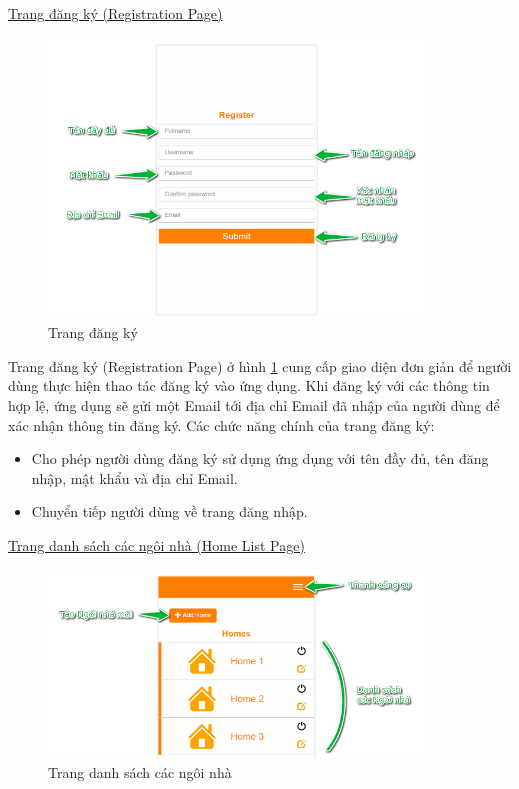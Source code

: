 \documentclass[12pt,a4paper,oneside]{extbook}
\begin{document}
\noindent
\underline{Trang đăng ký (Registration Page)}

\begin{figure}[h]
  \centering
     \includegraphics[width=10cm]{6-RegisterPage}
  \caption{Trang đăng ký}\label{fig:6-RegisterPage}
\end{figure}

\noindent
Trang đăng ký (Registration Page) ở hình \ref{fig:6-RegisterPage} cung cấp giao diện đơn giản để người dùng thực hiện thao tác đăng ký vào ứng dụng. Khi đăng ký với các thông tin hợp lệ, ứng dụng sẽ gửi một Email tới địa chỉ Email đã nhập của người dùng để xác nhận thông tin đăng ký. Các chức năng chính của trang đăng ký:

\begin{itemize}[topsep=1mm,itemsep=-0.5mm]
\item Cho phép người dùng đăng ký sử dụng ứng dụng với tên đầy đủ, tên đăng nhập, mật khẩu và địa chỉ Email.
\item Chuyển tiếp người dùng về trang đăng nhập.
\vspace{1mm}
\end{itemize}

\noindent
\underline{Trang danh sách các ngôi nhà (Home List Page)}

\begin{figure}[h]
  \centering
     \includegraphics[width=10cm]{6-HomeListPage}
  \caption{Trang danh sách các ngôi nhà}\label{fig:6-HomeListPage}
\end{figure}
\end{document}
